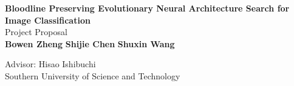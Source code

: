 \documentclass{article}
\begin{document}
	\begin{center}
    
    
		\LARGE{\textbf{Bloodline Preserving Evolutionary Neural Architecture Search for Image Classification}} \\
        \vspace{1em}
        \Large{Project Proposal} \\
        \vspace{1em}
        \normalsize\textbf{ Bowen Zheng   }  
        \normalsize\textbf{ Shijie Chen   } 
        \normalsize\textbf{ Shuxin Wang  } 
        
        \vspace{1em}
        \normalsize{Advisor: Hisao Ishibuchi} \\
        \vspace{1em}
        \normalsize{Southern University of Science and Technology} 
	\end{center}
\end{document}
